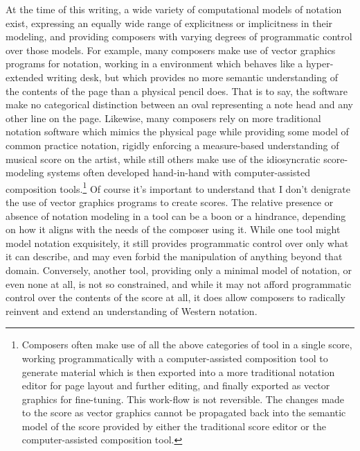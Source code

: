 At the time of this writing, a wide variety of computational models of notation
exist\citep{ baca2015tenor, trevino2013compositional}, expressing an equally
wide range of explicitness or implicitness in their modeling, and providing
composers with varying degrees of programmatic control over those models. For
example, many composers make use of vector graphics programs for notation,
working in a environment which behaves like a hyper-extended writing desk, but
which provides no more semantic understanding of the contents of the page than
a physical pencil does. That is to say, the software make no categorical
distinction between an oval representing a note head and any other line on the
page. Likewise, many composers rely on more traditional notation software which
mimics the physical page while providing some model of common practice
notation, rigidly enforcing a measure-based understanding of musical score on
the artist, while still others make use of the idiosyncratic score-modeling
systems often developed hand-in-hand with computer-assisted composition
tools.\footnote{Composers often make use of all the above categories of tool in
a single score, working programmatically with a computer-assisted composition
tool to generate material which is then exported into a more traditional
notation editor for page layout and further editing, and finally exported as
vector graphics for fine-tuning. This work-flow is not reversible. The changes
made to the score as vector graphics cannot be propagated back into the
semantic model of the score provided by either the traditional score editor or
the computer-assisted composition tool.} Of course it's important to understand
that I don't denigrate the use of vector graphics programs to create scores.
The relative presence or absence of notation modeling in a tool can be a boon
or a hindrance, depending on how it aligns with the needs of the composer using
it. While one tool might model notation exquisitely, it still provides
programmatic control over only what it can describe, and may even forbid the
manipulation of anything beyond that domain. Conversely, another tool,
providing only a minimal model of notation, or even none at all, is not so
constrained, and while it may not afford programmatic control over the contents
of the score at all, it does allow composers to radically reinvent and extend
an understanding of Western notation.

